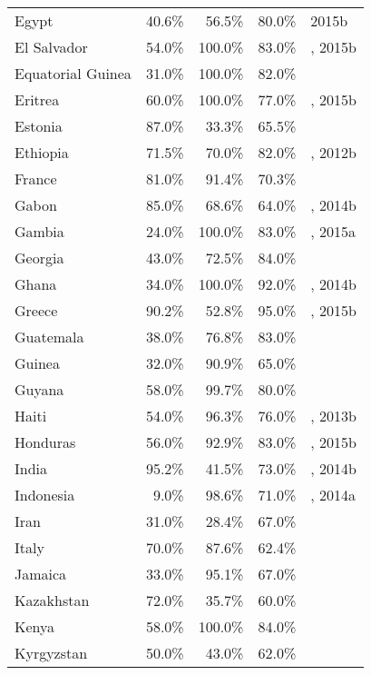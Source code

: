 \begin{longtable}{lrrrl}
  Egypt & 40.6\% & 56.5\% & 80.0\% & \cite{alarab2014} 2015b \\
  El Salvador & 54.0\% & 100.0\% & 83.0\% & \cite{Unaids2016-an}, 2015b \\
  Equatorial Guinea & 31.0\% & 100.0\% & 82.0\% & \cite{Unaids2016-an} \\
  Eritrea & 60.0\% & 100.0\% & 77.0\% & \cite{Unaids2016-an}, 2015b \\
  Estonia & 87.0\% & 33.3\% & 65.5\% & \cite{chip2014}  \\
  Ethiopia & 71.5\% & 70.0\% & 82.0\% & \cite{Unaids2016-am, usaid2013}, 2012b \\
  France & 81.0\% & 91.4\% & 70.3\% & \cite{aid2014} \\
  Gabon & 85.0\% & 68.6\% & 64.0\% & \cite{Unaids2016-an}, 2014b \\
  Gambia & 24.0\% & 100.0\% & 83.0\% & \cite{Unaids2016-an}, 2015a \\
  Georgia & 43.0\% & 72.5\% & 84.0\% & \cite{Unaids2016-an} \\
  Ghana & 34.0\% & 100.0\% & 92.0\% & \cite{Unaids2016-an}, 2014b \\
  Greece & 90.2\% & 52.8\% & 95.0\% & \cite{Unaids2016-an, Unaids2016-am}, 2015b \\
  Guatemala & 38.0\% & 76.8\% & 83.0\% & \cite{Unaids2016-an} \\
  Guinea & 32.0\% & 90.9\% & 65.0\% & \cite{Unaids2016-an} \\
  Guyana & 58.0\% & 99.7\% & 80.0\% & \cite{Unaids2016-an} \\
  Haiti & 54.0\% & 96.3\% & 76.0\% & \cite{Unaids2016-an}, 2013b \\
  Honduras & 56.0\% & 92.9\% & 83.0\% & \cite{Unaids2016-an}, 2015b \\
  India & 95.2\% & 41.5\% & 73.0\% & \cite{AIDSdatahub-fg}, 2014b \\
  Indonesia & 9.0\% & 98.6\% & 71.0\% & \cite{Unaids2016-an}, 2014a \\
  Iran & 31.0\% & 28.4\% & 67.0\% & \cite{Unaids2016-an} \\
  Italy & 70.0\% & 87.6\% & 62.4\% & \cite{camoni2015estimating}  \\
  Jamaica & 33.0\% & 95.1\% & 67.0\% & \cite{Unaids2016-an} \\
  Kazakhstan & 72.0\% & 35.7\% & 60.0\% & \cite{Unaids2016-an} \\
  Kenya & 58.0\% & 100.0\% & 84.0\% & \cite{Unaids2016-an} \\
  Kyrgyzstan & 50.0\% & 43.0\% & 62.0\% & \cite{Unaids2016-an} \\

\end{longtable}
